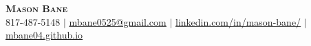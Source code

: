 \documentclass[letterpaper,11pt]{article}
\begin{document}

\begin{center}
    \textbf{\Huge \scshape Mason Bane} \\ \vspace{1pt}
    \small 817-487-5148 $|$ \href{mailto:mbane0525@gmail.com}{\underline{mbane0525@gmail.com}} $|$ 
    \href{https://www.linkedin.com/in/mason-bane/}{\underline{linkedin.com/in/mason-bane/}} $|$
    \href{https://mbane04.github.io}{\underline{mbane04.github.io}}
\end{center}


\vspace{-2pt}



\end{document}
